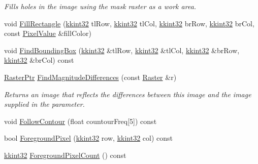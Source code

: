 \begin{DoxyCompactItemize}
\begin{DoxyCompactList}\small\item\em Fills holes in the image using the \textquotesingle{}mask\textquotesingle{} raster as a work area. \end{DoxyCompactList}\item 
void \hyperlink{class_k_k_b_1_1_raster_a01417ee32f63004e7ae6e385e6f0f66e}{Fill\+Rectangle} (\hyperlink{namespace_k_k_b_a8fa4952cc84fda1de4bec1fbdd8d5b1b}{kkint32} tl\+Row, \hyperlink{namespace_k_k_b_a8fa4952cc84fda1de4bec1fbdd8d5b1b}{kkint32} tl\+Col, \hyperlink{namespace_k_k_b_a8fa4952cc84fda1de4bec1fbdd8d5b1b}{kkint32} br\+Row, \hyperlink{namespace_k_k_b_a8fa4952cc84fda1de4bec1fbdd8d5b1b}{kkint32} br\+Col, const \hyperlink{class_k_k_b_1_1_pixel_value}{Pixel\+Value} \&fill\+Color)
\item 
void \hyperlink{class_k_k_b_1_1_raster_aee22b87a6feeb8a3e4a388400a23f616}{Find\+Bounding\+Box} (\hyperlink{namespace_k_k_b_a8fa4952cc84fda1de4bec1fbdd8d5b1b}{kkint32} \&tl\+Row, \hyperlink{namespace_k_k_b_a8fa4952cc84fda1de4bec1fbdd8d5b1b}{kkint32} \&tl\+Col, \hyperlink{namespace_k_k_b_a8fa4952cc84fda1de4bec1fbdd8d5b1b}{kkint32} \&br\+Row, \hyperlink{namespace_k_k_b_a8fa4952cc84fda1de4bec1fbdd8d5b1b}{kkint32} \&br\+Col) const 
\item 
\hyperlink{class_k_k_b_1_1_raster_aefa532857fd6aa9eb53f79da55a97c5a}{Raster\+Ptr} \hyperlink{class_k_k_b_1_1_raster_a4d5971382b178d3a1591a52fd31767c1}{Find\+Magnitude\+Differences} (const \hyperlink{class_k_k_b_1_1_raster}{Raster} \&r)
\begin{DoxyCompactList}\small\item\em Returns an image that reflects the differences between this image and the image supplied in the parameter. \end{DoxyCompactList}\item 
void \hyperlink{class_k_k_b_1_1_raster_a93fb53b114f805671e0898ec7f3fd682}{Follow\+Contour} (float countour\+Freq\mbox{[}5\mbox{]}) const 
\item 
bool \hyperlink{class_k_k_b_1_1_raster_aa1e1363589e719eb64f0957281b84b6a}{Foreground\+Pixel} (\hyperlink{namespace_k_k_b_a8fa4952cc84fda1de4bec1fbdd8d5b1b}{kkint32} row, \hyperlink{namespace_k_k_b_a8fa4952cc84fda1de4bec1fbdd8d5b1b}{kkint32} col) const 
\item 
\hyperlink{namespace_k_k_b_a8fa4952cc84fda1de4bec1fbdd8d5b1b}{kkint32} \hyperlink{class_k_k_b_1_1_raster_a38425a410e40696276be4f22de702eb6}{Foreground\+Pixel\+Count} () const 
\item 

\end{DoxyCompactItemize}
